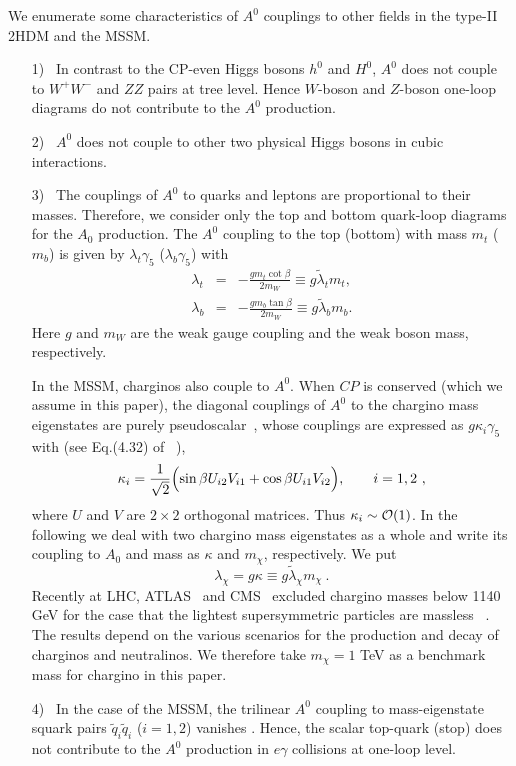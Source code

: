 \documentclass[final,5p,times,twocolumn]{elsarticle}
\newcommand{\bea}{\begin{eqnarray}}
\newcommand{\eea}{\end{eqnarray}}
\newcommand{\be}{\begin{equation}}
\newcommand{\ee}{\end{equation}}
\begin{document}
We enumerate some characteristics of $A^0$ couplings to other fields in the 
type-II 2HDM and the MSSM.
\begin{itemize}
\item[1)]\
In contrast to the CP-even Higgs bosons 
$h^0$ and $H^0$, $A^0$ does not couple to 
$W^+W^-$ and $ZZ$ pairs at tree level. Hence $W$-boson and $Z$-boson one-loop 
diagrams do not contribute to the $A^0$ production.
\item[2)]\
$A^0$ does not couple to other two physical Higgs bosons in  cubic interactions.
\item[3)]\
The couplings of $A^0$ to quarks and leptons are proportional to their masses. 
Therefore, we  consider only the top and bottom quark-loop diagrams for the $A_0$ production. 
The $A^0$ coupling to the top (bottom) with mass $m_t$ ($m_b$) is given by $\lambda_t \gamma_5$ ($\lambda_b \gamma_5$) with ~\cite{Hunter}
\bea
\lambda_t &=&-\frac{gm_t\cot\beta}{2m_W}\equiv g{\widetilde \lambda}_t m_t,
\label{lambdatop}\\
\lambda_b &=&-\frac{gm_b\tan\beta}{2m_W}\equiv g{\widetilde \lambda}_b m_b.
\label{lambdabottom}
\eea
Here $g$ and $m_W$ are the weak gauge coupling and the weak boson mass, 
respectively. 

\quad In the MSSM, charginos also couple to $A^0$.  When $CP$ is conserved (which we assume in this paper), the diagonal couplings of $A^0$ to the chargino mass eigenstates are purely pseudoscalar~\cite{GunionHaber}, whose couplings are expressed as $g\kappa_i \gamma_5$ with (see Eq.(4.32) of ~\cite{GunionHaber}),
\be
\kappa_i=\frac{1}{\sqrt{2}}\Bigl( \sin\beta U_{i2} V_{i1} +\cos\beta U_{i1} V_{i2} \Bigr),\qquad 
i=1,2~,
\ee
where $U$ and $V$ are $2\times 2$ orthogonal matrices.  Thus $\kappa_i \sim {\cal O}(1)$. 
In the following we deal with two chargino mass eigenstates as a whole and write its coupling to 
$A_0$ and mass as $\kappa$ and $m_\chi$, respectively. We put
\be
\lambda_\chi=g\kappa\equiv g{\widetilde \lambda}_\chi m_\chi~. \label{lambdachi}
\ee
Recently at LHC, ATLAS~\cite{ATLASchargino} and CMS~\cite{CMSchargino} excluded chargino masses below 1140 GeV for the case that the lightest supersymmetric particles are massless
~\cite{RPPexperiment}. 
The results depend on the various scenarios for the production and decay of charginos and neutralinos. We therefore take $m_\chi=1$ TeV as a benchmark mass for chargino in this paper.

\item[4)]\ In the case of the MSSM, the trilinear $A^0$ coupling
to mass-eigenstate squark pairs $\tilde{q}_i\tilde{q}_i$ ($i=1,2$) vanishes
\cite{Hunter}. 
Hence, the scalar top-quark (stop) does not contribute to the $A^0$ production 
in $e\gamma$ collisions at one-loop level.
\end{itemize}
\end{document}

